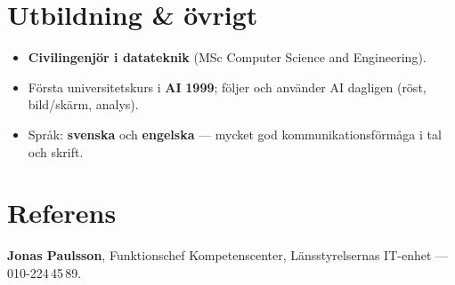 \documentclass[11pt,a4paper]{article}
\begin{document}
\vspace{0.3em}
\section*{Utbildning \& övrigt}
\begin{itemize}
  \item \textbf{Civilingenjör i datateknik} (MSc Computer Science and Engineering).
  \item Första universitetskurs i \textbf{AI} \textbf{1999}; följer och använder AI dagligen (röst, bild/skärm, analys).
  \item Språk: \textbf{svenska} och \textbf{engelska} — mycket god kommunikationsförmåga i tal och skrift.
\end{itemize}

\vspace{0.3em}
\section*{Referens}
\textbf{Jonas Paulsson}, Funktionschef Kompetenscenter, Länsstyrelsernas IT-enhet — 010-224\,45\,89.
\end{document}
